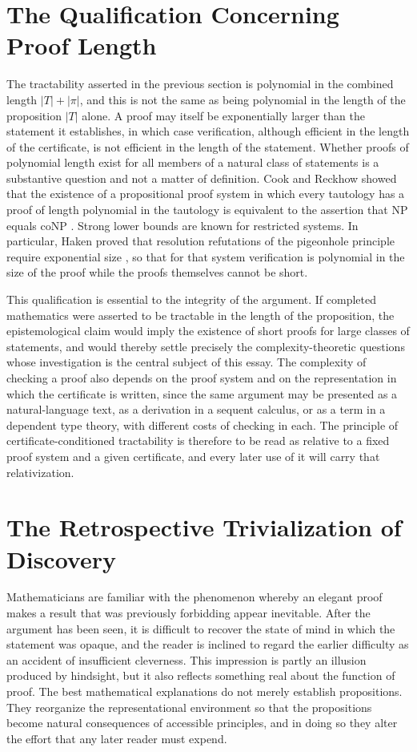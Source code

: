 \documentclass[11pt,letterpaper]{report}
\theoremstyle{plain}
\theoremstyle{definition}
\theoremstyle{remark}
\newcommand{\NP}{\mathrm{NP}}
\begin{document}
\section{The Qualification Concerning Proof Length}

The tractability asserted in the previous section is polynomial in the combined length $|T|+|\pi|$, and this is not the same as being polynomial in the length of the proposition $|T|$ alone. A proof may itself be exponentially larger than the statement it establishes, in which case verification, although efficient in the length of the certificate, is not efficient in the length of the statement. Whether proofs of polynomial length exist for all members of a natural class of statements is a substantive question and not a matter of definition. Cook and Reckhow showed that the existence of a propositional proof system in which every tautology has a proof of length polynomial in the tautology is equivalent to the assertion that $\NP$ equals $\mathrm{coNP}$ \cite{CookReckhow1979}. Strong lower bounds are known for restricted systems. In particular, Haken proved that resolution refutations of the pigeonhole principle require exponential size \cite{Haken1985}, so that for that system verification is polynomial in the size of the proof while the proofs themselves cannot be short.

This qualification is essential to the integrity of the argument. If completed mathematics were asserted to be tractable in the length of the proposition, the epistemological claim would imply the existence of short proofs for large classes of statements, and would thereby settle precisely the complexity-theoretic questions whose investigation is the central subject of this essay. The complexity of checking a proof also depends on the proof system and on the representation in which the certificate is written, since the same argument may be presented as a natural-language text, as a derivation in a sequent calculus, or as a term in a dependent type theory, with different costs of checking in each. The principle of certificate-conditioned tractability is therefore to be read as relative to a fixed proof system and a given certificate, and every later use of it will carry that relativization.

\section{The Retrospective Trivialization of Discovery}

Mathematicians are familiar with the phenomenon whereby an elegant proof makes a result that was previously forbidding appear inevitable. After the argument has been seen, it is difficult to recover the state of mind in which the statement was opaque, and the reader is inclined to regard the earlier difficulty as an accident of insufficient cleverness. This impression is partly an illusion produced by hindsight, but it also reflects something real about the function of proof. The best mathematical explanations do not merely establish propositions. They reorganize the representational environment so that the propositions become natural consequences of accessible principles, and in doing so they alter the effort that any later reader must expend.
\end{document}
